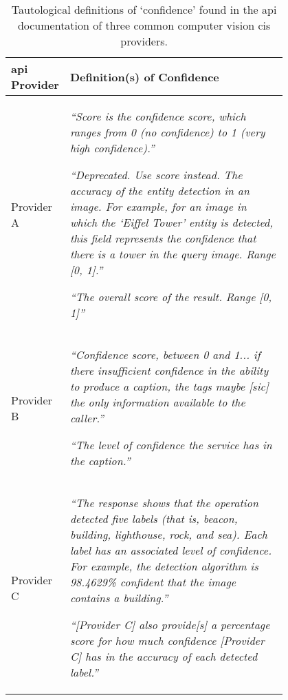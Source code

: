 \begin{table}[hbt]
  \centering
  \caption[Tautological definitions of confidence found in API documentation]{Tautological definitions of `confidence' found in the \gls{api} documentation of three common computer vision \gls{cis} providers.}
  \label{tab:introduction:motivation:scenario:pam:tautological}
  \begin{tabular}{l|p{0.8\linewidth}}
    \toprule
    \bfseries \gls{api} Provider &
    \bfseries Definition(s) of Confidence \\
    \midrule
    Provider A &
      \itshape  
      ``Score is the confidence score, which ranges from 0 (no confidence) to 1 (very high confidence).''
      \upshape
      \citep{Google:ConfidenceScore_DocsLabel}
      \bigskip
      
      \itshape  
      ``Deprecated. Use score instead. The accuracy of the entity detection in an image. For example, for an image in which the `Eiffel Tower' entity is detected, this field represents the confidence that there is a tower in the query image. Range [0, 1].'' 
      \upshape
      \citep{Google:ConfidenceScore_DotNet} 
      \bigskip
      
      \itshape  
      ``The overall score of the result. Range [0, 1]''
      \upshape
      \citep{Google:ConfidenceScore_DotNet} 
      \bigskip
    \\ 
    Provider B &
      \itshape  
        ``Confidence score, between 0 and 1... if there insufficient confidence in the ability to produce a caption, the tags maybe [sic] the only information available to the caller.''
      \upshape
      \citep{Azure:ConfidenceScore_HowToCall}
      \bigskip
      
      \itshape  
        ``The level of confidence the service has in the caption.''
      \upshape
      \citep{Azure:ConfidenceScore_JavaDocs}    
      \bigskip
    \\
    Provider C &
      \itshape  
        ``The response shows that the operation detected five labels (that is, beacon, building, lighthouse, rock, and sea). Each label has an associated level of confidence. For example, the detection algorithm is 98.4629\% confident that the image contains a building.''
      \upshape
      \citep{AWS:ConfidenceScore_DetectLabel}
      \bigskip
      
      \itshape  
        ``[Provider C] also provide[s] a percentage score for how much confidence [Provider C] has in the accuracy of each detected label.''
      \upshape
      \citep{AWS:ConfidenceScore_DetectObjScene}
    \\
    \bottomrule
  \end{tabular}
\end{table}
